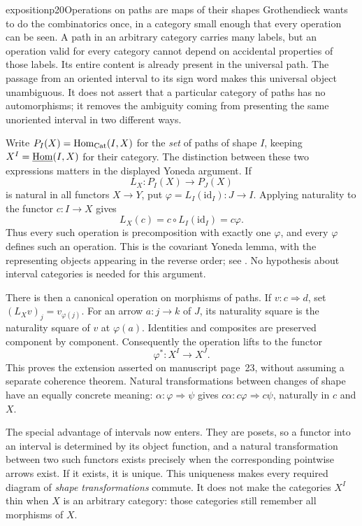 \begin{dcomment}{exposition}{p20}{Operations on paths are maps of their shapes}
Grothendieck wants to do the combinatorics once, in a category small enough that every operation can be seen. A path in an arbitrary category carries many labels, but an operation valid for every category cannot depend on accidental properties of those labels. Its entire content is already present in the universal path. The passage from an oriented interval to its sign word makes this universal object unambiguous. It does not assert that a particular category of paths has no automorphisms; it removes the ambiguity coming from presenting the same unoriented interval in two different ways.

Write $P_I(X)=\mathrm{Hom}_{\mathrm{Cat}}(I,X)$ for the \emph{set} of paths of shape $I$, keeping $X^I=\underline{\mathrm{Hom}}(I,X)$ for their category. The distinction between these two expressions matters in the displayed Yoneda argument. If
\[
 L_X:P_I(X)\longrightarrow P_J(X)
\]
is natural in all functors $X\to Y$, put $\varphi=L_I(\mathrm{id}_I):J\to I$. Applying naturality to the functor $c:I\to X$ gives
\[
 L_X(c)=c\circ L_I(\mathrm{id}_I)=c\varphi.
\]
Thus every such operation is precomposition with exactly one $\varphi$, and every $\varphi$ defines such an operation. This is the covariant Yoneda lemma, with the representing objects appearing in the reverse order; see \citet[Theorem~2.2.4 and Corollary~2.2.8]{Riehl2016}. No hypothesis about interval categories is needed for this argument.

There is then a canonical operation on morphisms of paths. If $v:c\Rightarrow d$, set $(L_Xv)_j=v_{\varphi(j)}$. For an arrow $a:j\to k$ of $J$, its naturality square is the naturality square of $v$ at $\varphi(a)$. Identities and composites are preserved component by component. Consequently the operation lifts to the functor
\[
 \varphi^*:X^I\longrightarrow X^J.
\]
This proves the extension asserted on manuscript page~23, without assuming a separate coherence theorem. Natural transformations between changes of shape have an equally concrete meaning: $\alpha:\varphi\Rightarrow\psi$ gives $c\alpha:c\varphi\Rightarrow c\psi$, naturally in $c$ and $X$.

The special advantage of intervals now enters. They are posets, so a functor into an interval is determined by its object function, and a natural transformation between two such functors exists precisely when the corresponding pointwise arrows exist. If it exists, it is unique. This uniqueness makes every required diagram of \emph{shape transformations} commute. It does not make the categories $X^I$ thin when $X$ is an arbitrary category: those categories still remember all morphisms of $X$.


\end{dcomment}

